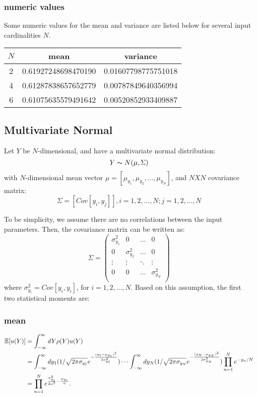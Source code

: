 \subsubsection{numeric values}
Some numeric values for the mean and variance are listed below for several input cardinalities $N$.
\begin{table}[h!]
\centering
\begin{tabular}{c|c|c}
$N$ & mean & variance \\ \hline
2 & 0.61927248698470190 & 0.01607798775751018 \\
4 & 0.61287838657652779 & 0.00787849640356994 \\
6 & 0.61075635579491642 & 0.00520852933409887
\end{tabular}
\end{table}

\subsection{Multivariate Normal}
Let $Y$ be $N$-dimensional, and have a multivariate normal distribution:
\begin{equation}
Y \thicksim N(\mu,\Sigma)
\end{equation}
with $N$-dimensional mean vector $\mu=[\mu_{y_1},\mu_{y_2},\ldots,\mu_{y_N}]$, and $N X N$ covariance matrix:
\begin{equation}
\Sigma = [Cov[y_i,y_j]],i = 1,2,\ldots,N; j = 1,2,\ldots,N
\end{equation}

To be simplicity, we assume there are no correlations between the input parameters. Then, the covariance matrix can be written
as:
\begin{equation}
\Sigma = 
\begin{pmatrix} 
\sigma_{y_1}^2 & 0 &\ldots & 0 \\ 
0 & \sigma_{y_2}^2 &\ldots & 0 \\ 
\vdots &\vdots &\ddots & \vdots \\ 
0 & 0 & \ldots & \sigma_{y_N}^2\\ 
\end{pmatrix} 
\end{equation}
where $\sigma_{y_i}^2 = Cov[y_i,y_i]$, for $i = 1,2,\ldots,N$. Based on this assumption, the first two statistical moments are:
\subsubsection{mean}
\begin{align}
\mathbb{E}[ u(Y)] &=\int_{-\infty}^\infty dY \rho(Y)u(Y) \notag \\
  &=\int_{-\infty}^\infty dy_1 (1/\sqrt{2 \pi \sigma_{y_1}}e^{-\frac{(y_1-\mu_{y_1})^2}{2\sigma_{y_1}^2}})\cdots\int_{-\infty}^\infty dy_N  (1/\sqrt{2 \pi \sigma_{y_N}}e^{-\frac{(y_N-\mu_{y_N})^2}{2\sigma_{y_N}^2}})\prod_{n=1}^N e^{-y_n/N} \\
  &=\prod_{n=1}^N e^{\frac{\sigma_{y_i}^2}{2n^2}-\frac{\mu_{y_i}}{n}}. \notag
\end{align}
